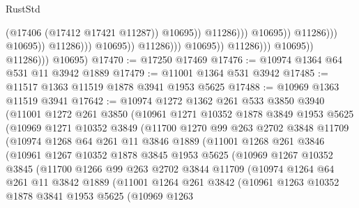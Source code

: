 \begin{lexlean}{RustStd}
\begin{coremodule}
                                                                  (@17406 (@17412 @17421 @11287))
                                                                  @10695))
                                                              @11286)))
                                                        @10695))
                                                    @11286)))
                                              @10695))
                                          @11286)))
                                    @10695))
                                @11286)))
                          @10695))
                      @11286)))
                @10695))
            @11286)))
      @10695)
@17470 := @17250 @17469
@17476 := @10974 @1364 @64 @531 @11 @3942 @1889
@17479 := @11001 @1364 @531 @3942
@17485 := @11517 @1363 @11519 @1878 @3941 @1953 @5625
@17488 := @10969 @1363 @11519 @3941
@17642 := @10974
    @1272
    @1362
    @261
    @533
    @3850
    @3940
    (@11001
      @1272
      @261
      @3850
      (@10961
        @1271
        @10352
        @1878
        @3849
        @1953
        @5625
        (@10969
          @1271
          @10352
          @3849
          (@11700
            @1270
            @99
            @263
            @2702
            @3848
            @11709
            (@10974
              @1268
              @64
              @261
              @11
              @3846
              @1889
              (@11001
                @1268
                @261
                @3846
                (@10961
                  @1267
                  @10352
                  @1878
                  @3845
                  @1953
                  @5625
                  (@10969
                    @1267
                    @10352
                    @3845
                    (@11700
                      @1266
                      @99
                      @263
                      @2702
                      @3844
                      @11709
                      (@10974
                        @1264
                        @64
                        @261
                        @11
                        @3842
                        @1889
                        (@11001
                          @1264
                          @261
                          @3842
                          (@10961
                            @1263
                            @10352
                            @1878
                            @3841
                            @1953
                            @5625
                            (@10969
                              @1263

\end{coremodule}
\end{lexlean}
